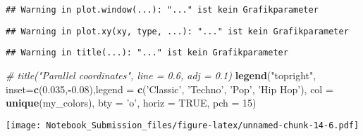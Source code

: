 \documentclass[
]{article}
\newenvironment{Shaded}{\begin{snugshade}}{\end{snugshade}}
\newcommand{\CommentTok}[1]{\textcolor[rgb]{0.56,0.35,0.01}{\textit{#1}}}
\newcommand{\DataTypeTok}[1]{\textcolor[rgb]{0.13,0.29,0.53}{#1}}
\newcommand{\DecValTok}[1]{\textcolor[rgb]{0.00,0.00,0.81}{#1}}
\newcommand{\FloatTok}[1]{\textcolor[rgb]{0.00,0.00,0.81}{#1}}
\newcommand{\KeywordTok}[1]{\textcolor[rgb]{0.13,0.29,0.53}{\textbf{#1}}}
\newcommand{\NormalTok}[1]{#1}
\newcommand{\OperatorTok}[1]{\textcolor[rgb]{0.81,0.36,0.00}{\textbf{#1}}}
\newcommand{\OtherTok}[1]{\textcolor[rgb]{0.56,0.35,0.01}{#1}}
\newcommand{\StringTok}[1]{\textcolor[rgb]{0.31,0.60,0.02}{#1}}
\begin{document}
\begin{verbatim}
## Warning in plot.window(...): "..." ist kein Grafikparameter
\end{verbatim}

\begin{verbatim}
## Warning in plot.xy(xy, type, ...): "..." ist kein Grafikparameter
\end{verbatim}

\begin{verbatim}
## Warning in title(...): "..." ist kein Grafikparameter
\end{verbatim}

\begin{Shaded}
\begin{Highlighting}[]
\CommentTok{# title("Parallel coordinates", line = 0.6, adj = 0.1)}
\KeywordTok{legend}\NormalTok{(}\StringTok{"topright"}\NormalTok{, }\DataTypeTok{inset=}\KeywordTok{c}\NormalTok{(}\FloatTok{0.035}\NormalTok{,}\OperatorTok{-}\FloatTok{0.08}\NormalTok{),}\DataTypeTok{legend =} \KeywordTok{c}\NormalTok{(}\StringTok{'Classic'}\NormalTok{, }\StringTok{'Techno'}\NormalTok{, }\StringTok{'Pop'}\NormalTok{, }\StringTok{'Hip Hop'}\NormalTok{), }\DataTypeTok{col =} \KeywordTok{unique}\NormalTok{(my_colors),}
  \DataTypeTok{bty =} \StringTok{'o'}\NormalTok{, }\DataTypeTok{horiz =} \OtherTok{TRUE}\NormalTok{, }\DataTypeTok{pch =} \DecValTok{15}\NormalTok{)}
\end{Highlighting}
\end{Shaded}

\texttt{[image: Notebook\_Submission\_files/figure-latex/unnamed-chunk-14-6.pdf]}

\begin{Shaded}
\end{Shaded}
\end{document}
